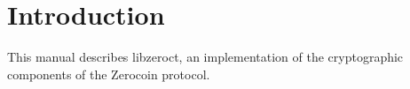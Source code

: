 \section{Introduction}

This manual describes \textsf{libzeroct}, an implementation of the cryptographic components of the Zerocoin protocol.